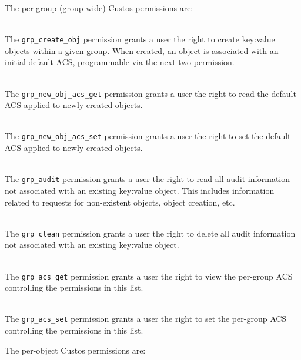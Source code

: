 \noindent
The per-group (group-wide) Custos permissions are:

\begin{packed_desc}
\item[\texttt{grp\_create\_obj}] \hfill \\ The
  \texttt{grp\_create\_obj} permission grants a user the right to
  create key:value objects within a given group. When created, an
  object is associated with an initial default ACS, programmable via
  the next two permission.
\item[\texttt{grp\_new\_obj\_acs\_get}] \hfill \\ The
  \texttt{grp\_new\_obj\_acs\_get} permission grants a user the right
  to read the default ACS applied to newly created objects.
\item[\texttt{grp\_new\_obj\_acs\_set}] \hfill \\ The
  \texttt{grp\_new\_obj\_acs\_set} permission grants a user the right
  to set the default ACS applied to newly created objects.
\item[\texttt{grp\_audit}] \hfill \\ The \texttt{grp\_audit}
  permission grants a user the right to read all audit information not
  associated with an existing key:value object. This includes
  information related to requests for non-existent objects, object
  creation, etc.
\item[\texttt{grp\_clean}] \hfill \\ The \texttt{grp\_clean}
  permission grants a user the right to delete all audit information
  not associated with an existing key:value object.
\item[\texttt{grp\_acs\_get}] \hfill \\ The \texttt{grp\_acs\_get}
  permission grants a user the right to view the per-group ACS
  controlling the permissions in this list.
\item[\texttt{grp\_acs\_set}] \hfill \\ The \texttt{grp\_acs\_set}
  permission grants a user the right to set the per-group ACS
  controlling the permissions in this list.
\end{packed_desc}

\noindent
The per-object Custos permissions are:

